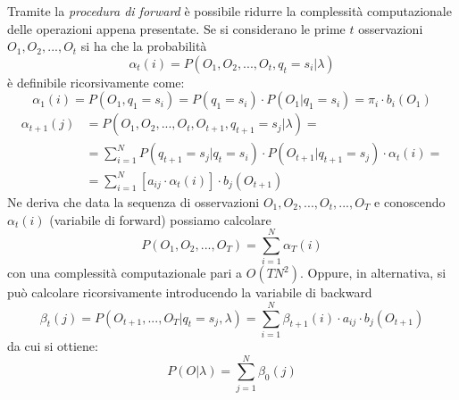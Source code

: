 \documentclass[a4paper,oneside,titlepage]{book}
\begin{document}
Tramite la \textit{procedura di forward} è possibile ridurre la complessità computazionale delle operazioni appena presentate. Se si considerano le prime $t$ osservazioni $O_1, O_2, ..., O_t$ si ha che la probabilità
\[ \alpha_t(i) = P(O_1,O_2,...,O_t,q_t=s_i|\lambda) \]
è definibile ricorsivamente come:
\[ \alpha_1(i) = P(O_1,q_1=s_i) = P(q_1=s_i) \cdot P(O_1|q_1=s_i) = \pi_i \cdot b_i(O_1) \]
\begin{align*}
    \alpha_{t+1}(j) &= P(O_1,O_2,...,O_t,O_{t+1},q_{t+1}=s_j|\lambda) = \\
    &= \sum_{i=1}^N P(q_{t+1}=s_j|q_t=s_i) \cdot P(O_{t+1}|q_{t+1}=s_j) \cdot \alpha_t(i) = \\
    &= \sum_{i=1}^N [a_{ij} \cdot \alpha_t(i)] \cdot b_j(O_{t+1})
\end{align*}
Ne deriva che data la sequenza di osservazioni $O_1, O_2, ..., O_t, ..., O_T$ e conoscendo $\alpha_t(i)$ (variabile di forward) possiamo calcolare
\[ P(O_1,O_2,...,O_T) = \sum_{i=1}^N \alpha_T(i) \]
con una complessità computazionale pari a $O(TN^2)$. Oppure, in alternativa, si può calcolare ricorsivamente introducendo la variabile di backward
\[ \beta_t(j) = P(O_{t+1},...,O_T|q_t=s_j,\lambda) = \sum_{i=1}^N \beta_{t+1}(i) \cdot a_{ij} \cdot b_j(O_{t+1}) \]
da cui si ottiene:
\[ P(O|\lambda) = \sum_{j=1}^N \beta_0(j) \]
\end{document}
